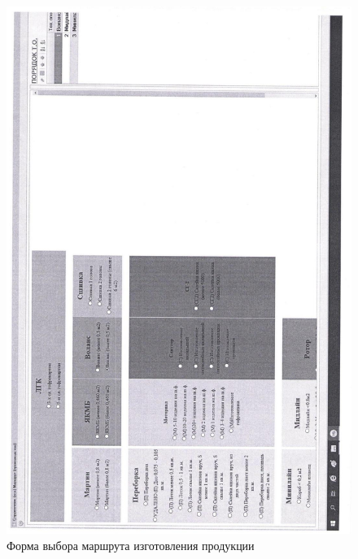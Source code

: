 %
\begin{figure}
\begin{center}
  \includegraphics[width=\linewidth, height=0.94\textheight, keepaspectratio]{Pics/d06.jpg}
\end{center}
  \caption{Форма выбора маршрута изготовления продукции}
  \label{pic:d06}
\end{figure}
\clearpage



